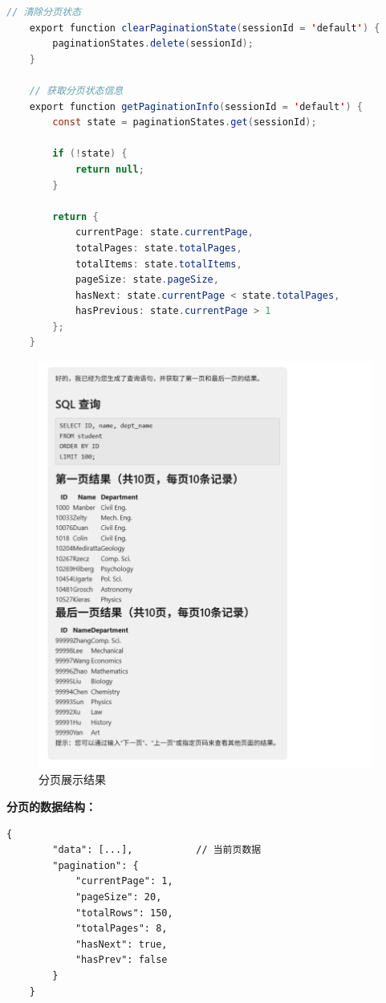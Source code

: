 \documentclass{article}
\begin{document}
\begin{lstlisting}[language=java, title=结果分页代码逻辑, tabsize=4]
    // 清除分页状态
    export function clearPaginationState(sessionId = 'default') {
    	paginationStates.delete(sessionId);
    }
    
    // 获取分页状态信息
    export function getPaginationInfo(sessionId = 'default') {
    	const state = paginationStates.get(sessionId);
    	
    	if (!state) {
    		return null;
    	}
    	
    	return {
    		currentPage: state.currentPage,
    		totalPages: state.totalPages,
    		totalItems: state.totalItems,
    		pageSize: state.pageSize,
    		hasNext: state.currentPage < state.totalPages,
    		hasPrevious: state.currentPage > 1
    	};
    }
	\end{lstlisting}
	
	\begin{figure}[H]
		\centering
		\includegraphics[width=11cm]{./images/2.分页.jpg}
		\caption{分页展示结果}
	\end{figure}
	
	\textbf{分页的数据结构：}
	
	\begin{lstlisting}[title=分页的数据结构, tabsize=4]
	{
		"data": [...],           // 当前页数据
		"pagination": {
			"currentPage": 1,
			"pageSize": 20,
			"totalRows": 150,
			"totalPages": 8,
			"hasNext": true,
			"hasPrev": false
		}
	}
	\end{lstlisting}
	
\end{document}
